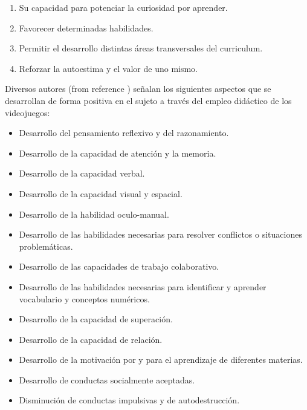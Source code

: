 \documentclass{bmcart}
\begin{document}
\newline
\begin{enumerate}
	\item Su capacidad para potenciar la curiosidad por aprender.
	\item Favorecer determinadas habilidades.
	\item Permitir el desarrollo distintas áreas transversales del curriculum.
	\item Reforzar la autoestima y el valor de uno mismo.
\end{enumerate}
	Diversos autores (from reference \cite{funk1993reevaluating} \cite{mcfa} \cite{etche} \cite{GRECTPPR-022840}) señalan los siguientes aspectos que se desarrollan de forma positiva en el sujeto a través del empleo didáctico de los videojuegos:
	\newline
	\newline
	\begin{itemize}
		\item Desarrollo del pensamiento reflexivo y del razonamiento.
		\item Desarrollo de la capacidad de atención y la memoria.
		\item Desarrollo de la capacidad verbal.
		\item Desarrollo de la capacidad visual y espacial.
		\item Desarrollo de la habilidad oculo-manual.
		\item Desarrollo de las habilidades necesarias para resolver conflictos o situaciones problemáticas.
		\item Desarrollo de las capacidades de trabajo colaborativo.
		\item Desarrollo de las habilidades necesarias para identificar y aprender vocabulario y conceptos numéricos.
		\item Desarrollo de la capacidad de superación.
		\item Desarrollo de la capacidad de relación.
		\item Desarrollo de la motivación por y para el aprendizaje de diferentes materias.
		\item Desarrollo de conductas socialmente aceptadas.
		\item Disminución de conductas impulsivas y de autodestrucción.
	\end{itemize}
	
\end{document}
